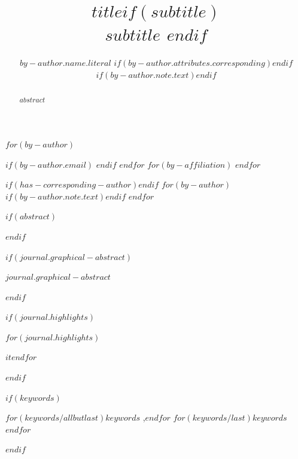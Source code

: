 
\begin{frontmatter}
\title{$title$$if(subtitle)$ \\\large{$subtitle$} $endif$}
$for(by-author)$\author[$for(by-author.affiliations)$$it.number$$sep$,$endfor$]{$by-author.name.literal$%
$if(by-author.attributes.corresponding)$$endif$%
$if(by-author.note.text)$$endif$}
$if(by-author.email)$  $endif$
$endfor$
$for(by-affiliation)$
$endfor$

$if(has-corresponding-author)$$endif$
$for(by-author)$
$if(by-author.note.text)$$endif$
$endfor$
        
$if(abstract)$
\begin{abstract}
$abstract$
\end{abstract}
$endif$

$if(journal.graphical-abstract)$\begin{graphicalabstract}
$journal.graphical-abstract$
\end{graphicalabstract}
$endif$

$if(journal.highlights)$\begin{highlights}
$for(journal.highlights)$\item $it$$endfor$
\end{highlights}
$endif$

$if(keywords)$
\begin{keyword}
    $for(keywords/allbutlast)$$keywords$ \sep $endfor$
    $for(keywords/last)$$keywords$$endfor$
\end{keyword}
$endif$
\end{frontmatter}
    